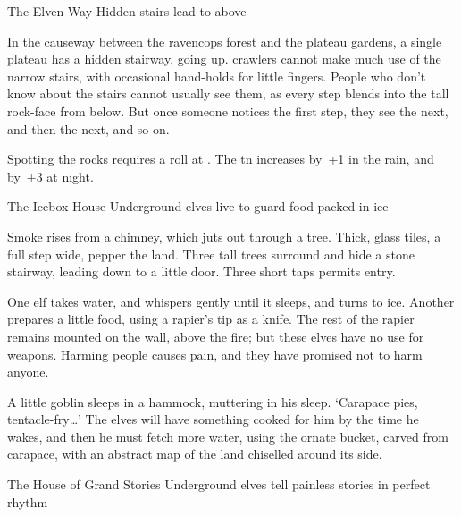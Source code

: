 \begin{multicols}{2}
{The Elven Way}%
{Hidden stairs lead to  above}%

In the causeway between the \gls{ravencops} forest and the plateau gardens, a single plateau has a hidden stairway, going up.
\Glspl{crawler} cannot make much use of the narrow stairs, with occasional hand-holds for little fingers.
People who don't know about the stairs cannot usually see them, as every step blends into the tall rock-face from below.
But once someone notices the first step, they see the next, and then the next, and so on.

Spotting the rocks requires a  roll at \tn[12].
The \gls{tn} increases by~+1 in the rain, and by~+3 at night.


{The Icebox House}%
{Underground elves live to guard food packed in ice}%


Smoke rises from a chimney, which juts out through a tree.
Thick, glass tiles, a full step wide, pepper the land.
Three tall trees surround and hide a stone stairway, leading down to a little door.
Three short taps permits entry.

One elf takes water, and whispers gently until it sleeps, and turns to ice.
Another prepares a little food, using a rapier's tip as a knife.
The rest of the rapier remains mounted on the wall, above the fire; but these elves have no use for weapons.
Harming people causes pain, and they have promised not to harm anyone.

A little goblin sleeps in a hammock, muttering in his sleep.
`Carapace pies, tentacle-fry\ldots'
The elves will have something cooked for him by the time he wakes, and then he must fetch more water, using the ornate bucket, carved from carapace, with an abstract map of the land chiselled around its side.

{The House of Grand Stories}%
{Underground elves tell painless stories in perfect rhythm}%


\end{multicols}
